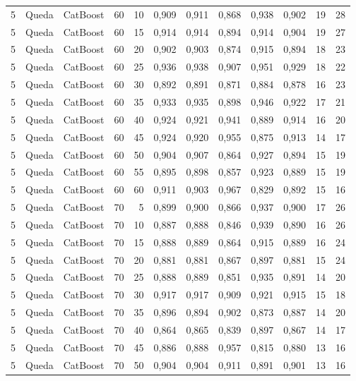 \begin{longtable}{@{}rllrrrrrrrrr@{}}
5 & Queda & CatBoost & 60 & 10 & 0,909 & 0,911 & 0,868 & 0,938 & 0,902 & 19 & 28 \\
5 & Queda & CatBoost & 60 & 15 & 0,914 & 0,914 & 0,894 & 0,914 & 0,904 & 19 & 27 \\
5 & Queda & CatBoost & 60 & 20 & 0,902 & 0,903 & 0,874 & 0,915 & 0,894 & 18 & 23 \\
5 & Queda & CatBoost & 60 & 25 & 0,936 & 0,938 & 0,907 & 0,951 & 0,929 & 18 & 22 \\
5 & Queda & CatBoost & 60 & 30 & 0,892 & 0,891 & 0,871 & 0,884 & 0,878 & 16 & 23 \\
5 & Queda & CatBoost & 60 & 35 & 0,933 & 0,935 & 0,898 & 0,946 & 0,922 & 17 & 21 \\
5 & Queda & CatBoost & 60 & 40 & 0,924 & 0,921 & 0,941 & 0,889 & 0,914 & 16 & 20 \\
5 & Queda & CatBoost & 60 & 45 & 0,924 & 0,920 & 0,955 & 0,875 & 0,913 & 14 & 17 \\
5 & Queda & CatBoost & 60 & 50 & 0,904 & 0,907 & 0,864 & 0,927 & 0,894 & 15 & 19 \\
5 & Queda & CatBoost & 60 & 55 & 0,895 & 0,898 & 0,857 & 0,923 & 0,889 & 15 & 19 \\
5 & Queda & CatBoost & 60 & 60 & 0,911 & 0,903 & 0,967 & 0,829 & 0,892 & 15 & 16 \\
5 & Queda & CatBoost & 70 & 5 & 0,899 & 0,900 & 0,866 & 0,937 & 0,900 & 17 & 26 \\
5 & Queda & CatBoost & 70 & 10 & 0,887 & 0,888 & 0,846 & 0,939 & 0,890 & 16 & 26 \\
5 & Queda & CatBoost & 70 & 15 & 0,888 & 0,889 & 0,864 & 0,915 & 0,889 & 16 & 24 \\
5 & Queda & CatBoost & 70 & 20 & 0,881 & 0,881 & 0,867 & 0,897 & 0,881 & 15 & 24 \\
5 & Queda & CatBoost & 70 & 25 & 0,888 & 0,889 & 0,851 & 0,935 & 0,891 & 14 & 20 \\
5 & Queda & CatBoost & 70 & 30 & 0,917 & 0,917 & 0,909 & 0,921 & 0,915 & 15 & 18 \\
5 & Queda & CatBoost & 70 & 35 & 0,896 & 0,894 & 0,902 & 0,873 & 0,887 & 14 & 20 \\
5 & Queda & CatBoost & 70 & 40 & 0,864 & 0,865 & 0,839 & 0,897 & 0,867 & 14 & 17 \\
5 & Queda & CatBoost & 70 & 45 & 0,886 & 0,888 & 0,957 & 0,815 & 0,880 & 13 & 16 \\
5 & Queda & CatBoost & 70 & 50 & 0,904 & 0,904 & 0,911 & 0,891 & 0,901 & 13 & 16 \\

\end{longtable}
